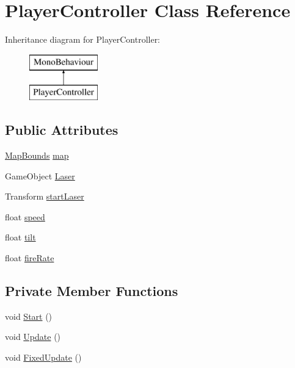 \hypertarget{class_player_controller}{}\section{Player\+Controller Class Reference}
\label{class_player_controller}
Inheritance diagram for Player\+Controller\+:\begin{figure}[H]
\begin{center}
\leavevmode
\includegraphics[height=2.000000cm]{class_player_controller}
\end{center}
\end{figure}
\subsection*{Public Attributes}
\begin{DoxyCompactItemize}
\item 
\mbox{\hyperlink{class_map_bounds}{Map\+Bounds}} \mbox{\hyperlink{class_player_controller_ae7832037e53c9031202ad60873a11498}{map}}
\item 
Game\+Object \mbox{\hyperlink{class_player_controller_a690a962b91653c2fdba718d5775a60eb}{Laser}}
\item 
Transform \mbox{\hyperlink{class_player_controller_ad0643bd4ceef85ae7e427bd08a7fd401}{start\+Laser}}
\item 
float \mbox{\hyperlink{class_player_controller_a0928605583f0563cd84fe43119d336ec}{speed}}
\item 
float \mbox{\hyperlink{class_player_controller_ac3e62babe8d87ccdfc0216fac5fe1688}{tilt}}
\item 
float \mbox{\hyperlink{class_player_controller_aec1e8f25c69ea198fe38f965307437a4}{fire\+Rate}}
\end{DoxyCompactItemize}
\subsection*{Private Member Functions}
\begin{DoxyCompactItemize}
\item 
void \mbox{\hyperlink{class_player_controller_ae1117d9c4da3193181cddad2c814e467}{Start}} ()
\item 
void \mbox{\hyperlink{class_player_controller_ae8bc83dffb99867a04be016473ed2c43}{Update}} ()
\item 
void \mbox{\hyperlink{class_player_controller_ae5bdb1b48571f67c3f722a58b6f404d4}{Fixed\+Update}} ()
\end{DoxyCompactItemize}
